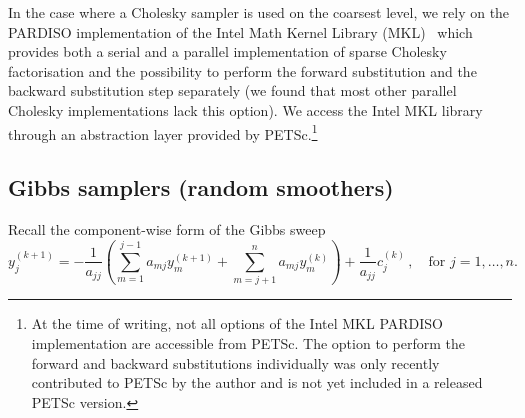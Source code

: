 \documentclass[
fontsize=11pt,
paper=a4,
numbers=noenddot
]{scrartcl}
\begin{document}
 In the case where a Cholesky sampler is used on the coarsest level, we rely on the PARDISO implementation of the Intel Math Kernel Library (MKL)~\cite{intelmkl} which provides both a serial and a parallel implementation of sparse Cholesky factorisation and the possibility to perform the forward substitution and the backward substitution step separately (we found that most other parallel Cholesky implementations lack this option). We access the Intel MKL library through an abstraction layer provided by PETSc.\footnote{At the time of writing, not all options of the Intel MKL PARDISO implementation are accessible from PETSc. The option to perform the forward and backward substitutions individually was only recently contributed to PETSc by the author and is not yet included in a released PETSc version.} 

\subsection{Gibbs samplers (random smoothers)}

Recall the component-wise form of the Gibbs sweep
\begin{equation}
    y^{(k+1)}_j = - \frac{1}{a_{jj}} \left(
        \sum_{m=1}^{j-1} a_{mj} y^{(k+1)}_m + \sum_{m=j+1}^n a_{mj} y^{(k)}_m
      \right) + \frac{1}{a_{jj}} c^{(k)}_j \,,\quad \text{for $j=1,\dotsc,n$.}
      \label{eq:gibbs_comp2}
\end{equation}
\end{document}
